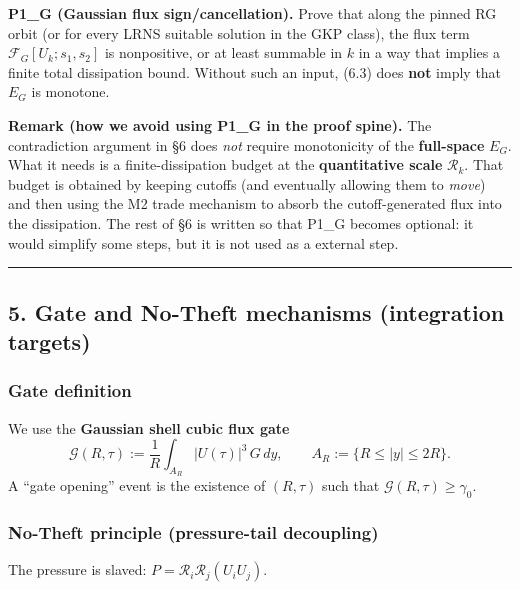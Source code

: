 \documentclass[
  11pt,
]{article}
\begin{document}
\textbf{P1\_G (Gaussian flux sign/cancellation).} Prove that along the pinned RG orbit (or for every LRNS suitable solution in the GKP class), the flux term \(\mathcal F_G[U_k;s_1,s_2]\) is nonpositive, or at least summable in \(k\) in a way that implies a finite total dissipation bound. Without such an input, (6.3) does \textbf{not} imply that \(E_G\) is monotone.

\textbf{Remark (how we avoid using P1\_G in the proof spine).} The contradiction argument in §6 does \emph{not} require monotonicity of the \textbf{full-space} \(E_G\). What it needs is a finite-dissipation budget at the \textbf{quantitative scale} \(\mathcal R_k\). That budget is obtained by keeping cutoffs (and eventually allowing them to \emph{move}) and then using the M2 trade mechanism to absorb the cutoff-generated flux into the dissipation. The rest of §6 is written so that P1\_G becomes optional: it would simplify some steps, but it is not used as a external step.

\begin{center}\rule{0.5\linewidth}{0.5pt}\end{center}

\hypertarget{gate-and-no-theft-mechanisms-integration-targets}{%
\subsection{5. Gate and No-Theft mechanisms (integration targets)}\label{gate-and-no-theft-mechanisms-integration-targets}}

\hypertarget{gate-definition}{%
\subsubsection{Gate definition}\label{gate-definition}}

We use the \textbf{Gaussian shell cubic flux gate} \[
\mathcal G(R,\tau):=\frac{1}{R}\int_{A_R}|U(\tau)|^3\,G\,dy,
\qquad A_R:=\{R\le|y|\le 2R\}.
\] A ``gate opening'' event is the existence of \((R,\tau)\) such that \(\mathcal G(R,\tau)\ge\gamma_0\).

\hypertarget{no-theft-principle-pressure-tail-decoupling}{%
\subsubsection{No-Theft principle (pressure-tail decoupling)}\label{no-theft-principle-pressure-tail-decoupling}}

The pressure is slaved: \(P=\mathcal R_i\mathcal R_j(U_iU_j)\).
\end{document}

